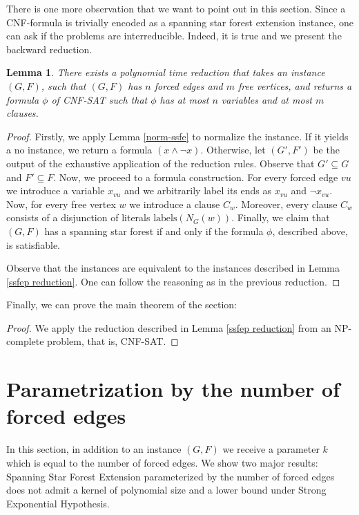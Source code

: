 \documentclass[en]{pracamgr}
\newtheorem{lemma}{Lemma}
\theoremstyle{definition}
\newcommand{\ssfep}{{\sc Spanning Star Forest Extension}}
\newcommand{\cnfsat}{{\sc CNF-SAT}}
\begin{document}
There is one more observation that we want to point out in this section. Since a CNF-formula is trivially encoded as a spanning star forest extension instance, one can ask if the problems are interreducible. Indeed, it is true and we present the backward reduction.

\begin{lemma}\label{cnfsat reduction}
	There exists a polynomial time reduction that takes an instance $(G,F)$, such that $(G,F)$ has $n$ forced edges and $m$ free vertices, and returns a formula $\phi$ of \cnfsat{} such that $\phi$ has at most $n$ variables and at most $m$ clauses.
\end{lemma}

\begin{proof}
	Firstly, we apply Lemma \ref{norm-ssfe} to normalize the instance. If it yields a no instance, we return a formula $(x \land \neg x)$. Otherwise, let $(G',F')$ be the output of the exhaustive application of the reduction rules. Observe that $G' \subseteq G$ and $F' \subseteq F$. Now, we proceed to a formula construction. For every forced edge $vu$ we introduce a variable $x_{vu}$ and we arbitrarily label its ends as $x_{vu}$ and $\neg x_{vu}$. Now, for every free vertex $w$ we introduce a clause $C_w$. Moreover, every clause $C_w$ consists of a disjunction of literals $\textrm{labels}(N_G(w))$. Finally, we claim that $(G,F)$ has a spanning star forest if and only if the formula $\phi$, described above, is satisfiable.
	
	Observe that the instances are equivalent to the instances described in Lemma \ref{ssfep reduction}. One can follow the reasoning as in the previous reduction.
\end{proof}

Finally, we can prove the main theorem of the section:

\thmssfepnpc*

\begin{proof}
	We apply the reduction described in Lemma \ref{ssfep reduction} from an NP-complete problem, that is, \cnfsat{}.
\end{proof}

\section{Parametrization by the number of forced edges}

In this section, in addition to an instance $(G,F)$ we receive a parameter $k$ which is equal to the number of forced edges. We show two major results: \ssfep{} parameterized by the number of forced edges does not admit a kernel of polynomial size and a lower bound under Strong Exponential Hypothesis.
\end{document}
